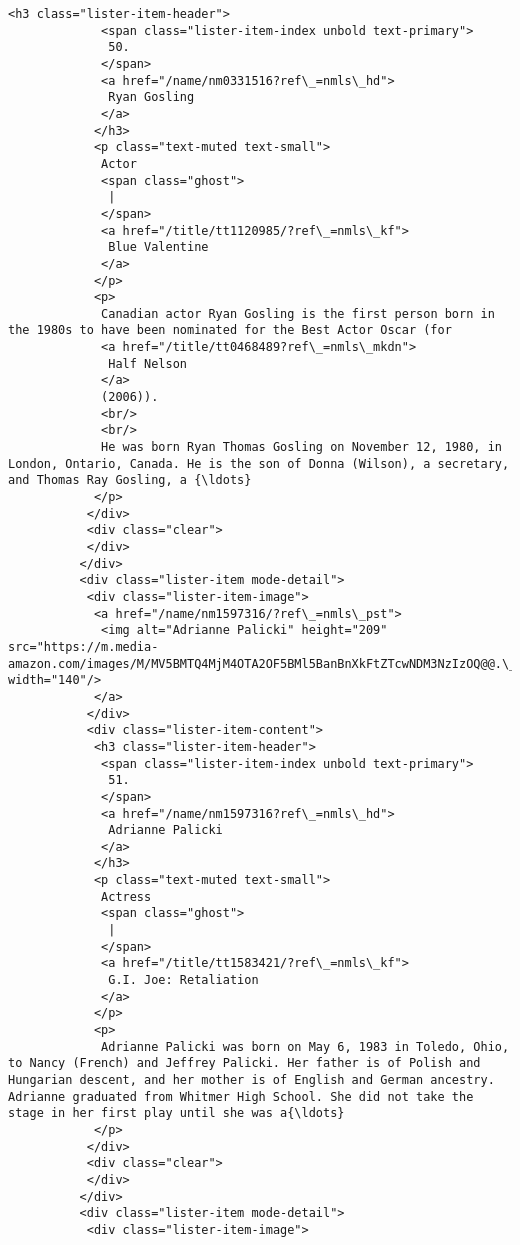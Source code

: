 \documentclass[11pt]{article}
\begin{document}
\begin{Verbatim}[commandchars=\\\{\}]
            <h3 class="lister-item-header">
             <span class="lister-item-index unbold text-primary">
              50.
             </span>
             <a href="/name/nm0331516?ref\_=nmls\_hd">
              Ryan Gosling
             </a>
            </h3>
            <p class="text-muted text-small">
             Actor
             <span class="ghost">
              |
             </span>
             <a href="/title/tt1120985/?ref\_=nmls\_kf">
              Blue Valentine
             </a>
            </p>
            <p>
             Canadian actor Ryan Gosling is the first person born in the 1980s to have been nominated for the Best Actor Oscar (for
             <a href="/title/tt0468489?ref\_=nmls\_mkdn">
              Half Nelson
             </a>
             (2006)).
             <br/>
             <br/>
             He was born Ryan Thomas Gosling on November 12, 1980, in London, Ontario, Canada. He is the son of Donna (Wilson), a secretary, and Thomas Ray Gosling, a {\ldots}
            </p>
           </div>
           <div class="clear">
           </div>
          </div>
          <div class="lister-item mode-detail">
           <div class="lister-item-image">
            <a href="/name/nm1597316/?ref\_=nmls\_pst">
             <img alt="Adrianne Palicki" height="209" src="https://m.media-amazon.com/images/M/MV5BMTQ4MjM4OTA2OF5BMl5BanBnXkFtZTcwNDM3NzIzOQ@@.\_V1\_UX140\_CR0,0,140,209\_AL\_.jpg" width="140"/>
            </a>
           </div>
           <div class="lister-item-content">
            <h3 class="lister-item-header">
             <span class="lister-item-index unbold text-primary">
              51.
             </span>
             <a href="/name/nm1597316?ref\_=nmls\_hd">
              Adrianne Palicki
             </a>
            </h3>
            <p class="text-muted text-small">
             Actress
             <span class="ghost">
              |
             </span>
             <a href="/title/tt1583421/?ref\_=nmls\_kf">
              G.I. Joe: Retaliation
             </a>
            </p>
            <p>
             Adrianne Palicki was born on May 6, 1983 in Toledo, Ohio, to Nancy (French) and Jeffrey Palicki. Her father is of Polish and Hungarian descent, and her mother is of English and German ancestry. Adrianne graduated from Whitmer High School. She did not take the stage in her first play until she was a{\ldots}
            </p>
           </div>
           <div class="clear">
           </div>
          </div>
          <div class="lister-item mode-detail">
           <div class="lister-item-image">

\end{Verbatim}
\end{document}
